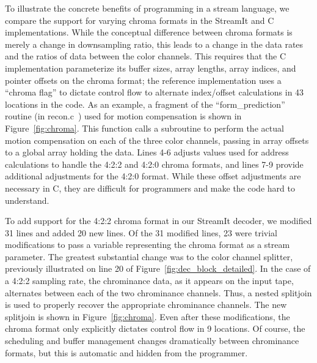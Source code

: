 \label{section:chroma}

To illustrate the concrete benefits of programming in a stream
language, we compare the support for varying chroma formats in the
StreamIt and C implementations.  While the conceptual difference
between chroma formats is merely a change in downsampling ratio, this
leads to a change in the data rates and the ratios of data between the
color channels. This requires that the C implementation parameterize
its buffer sizes, array lengths, array indices, and pointer offsets on
the chroma format; the reference implementation uses a ``chroma flag''
to dictate control flow to alternate index/offset calculations in 43
locations in the code. As an example, a fragment of the
``form\_prediction'' routine (in recon.c~\cite{reference-mpeg-c}) used
for motion compensation is shown in Figure~\ref{fig:chroma}. This
function calls a subroutine to perform the actual motion compensation
on each of the three color channels, passing in array offsets to a
global array holding the data. Lines 4-6 adjusts values used for
address calculations to handle the 4:2:2 and 4:2:0 chroma formats, and
lines 7-9 provide additional adjustments for the 4:2:0 format. While
these offset adjustments are necessary in C, they are difficult for
programmers and make the code hard to understand.

To add support for the 4:2:2 chroma format in our StreamIt decoder, we
modified 31 lines and added 20 new lines. Of the 31 modified lines, 23
were trivial modifications to pass a variable representing the chroma
format as a stream parameter. The greatest substantial change was to
the color channel splitter, previously illustrated on line 20 of
Figure~\ref{fig:dec_block_detailed}. In the case of a 4:2:2 sampling
rate, the chrominance data, as it appears on the input tape,
alternates between each of the two chrominance channels. Thus, a
nested splitjoin is used to properly recover the appropriate
chrominance channels. The new splitjoin is shown in
Figure~\ref{fig:chroma}.  Even after these modifications, the chroma
format only explicitly dictates control flow in 9 locations. Of
course, the scheduling and buffer management changes dramatically
between chrominance formats, but this is automatic and hidden from the
programmer.

